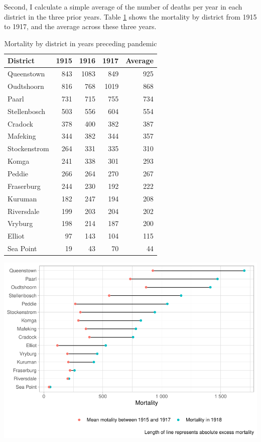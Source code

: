 \documentclass[fleqn,10pt,lineno]{wlpeerj} %
\begin{document}
Second, I calculate a simple average of the number of deaths per year in each district in the three prior years. Table \ref{tab:mean-mortality-by-district-tab} shows the mortality by district from 1915 to 1917, and the average across these three years.

\begin{table}

\caption{\label{tab:mean-mortality-by-district-tab}Mortality by district in years preceding pandemic}
\centering
\begin{tabular}[t]{l|r|r|r|r}
\hline
District & 1915 & 1916 & 1917 & Average\\
\hline
Queenstown & 843 & 1083 & 849 & 925\\
\hline
Oudtshoorn & 816 & 768 & 1019 & 868\\
\hline
Paarl & 731 & 715 & 755 & 734\\
\hline
Stellenbosch & 503 & 556 & 604 & 554\\
\hline
Cradock & 378 & 400 & 382 & 387\\
\hline
Mafeking & 344 & 382 & 344 & 357\\
\hline
Stockenstrom & 264 & 331 & 335 & 310\\
\hline
Komga & 241 & 338 & 301 & 293\\
\hline
Peddie & 266 & 264 & 270 & 267\\
\hline
Fraserburg & 244 & 230 & 192 & 222\\
\hline
Kuruman & 182 & 247 & 194 & 208\\
\hline
Riversdale & 199 & 203 & 204 & 202\\
\hline
Vryburg & 198 & 214 & 187 & 200\\
\hline
Elliot & 97 & 143 & 104 & 115\\
\hline
Sea Point & 19 & 43 & 70 & 44\\
\hline
\end{tabular}
\end{table}

\includegraphics{spanish-flu-mortality_bookdown_files/figure-latex/unnamed-chunk-4-1.pdf}
\end{document}
